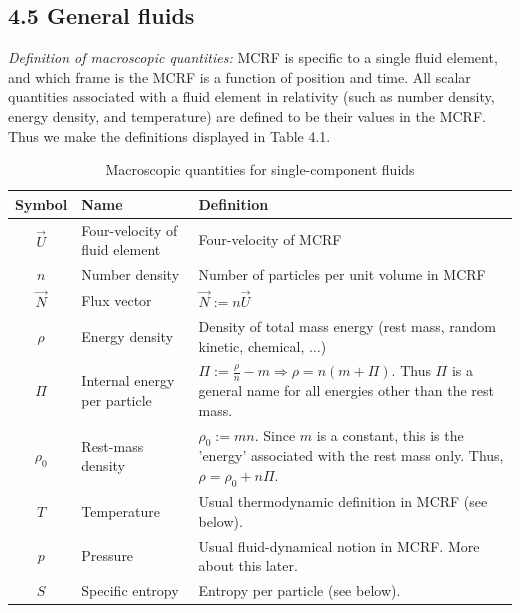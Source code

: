 \documentclass[12pt]{book}
\begin{document}
    \subsection{4.5 General fluids}

    \textit{Definition of macroscopic quantities:}
    MCRF is specific to a single fluid element, and which frame is the MCRF is a function of position and time. All scalar quantities associated with a fluid element in relativity (such as number density, energy density, and temperature) are defined to be their values in the MCRF. Thus we make the definitions displayed in Table 4.1.
    \begin{table}[h]
    \centering
    \begin{tabular}{|c|l|l|}
    \hline
    \textbf{Symbol} & \textbf{Name} & \textbf{Definition} \\ \hline
    \(\vec{U}\) & Four-velocity of fluid element & Four-velocity of MCRF \\ \hline
    \(n\) & Number density & Number of particles per unit volume in MCRF \\ \hline
    \(\vec{N}\) & Flux vector & \(\vec{N} := n\vec{U}\) \\ \hline
    \(\rho\) & Energy density & Density of total mass energy (rest mass, random kinetic, chemical, $\dots$)\\ \hline
    \(\Pi\) & Internal energy per particle & \(\Pi := \frac{\rho}{n} - m \Rightarrow \rho = n(m + \Pi)\). Thus \(\Pi\) is a general name for all energies other than the rest mass.\\ \hline
    \(\rho_0\) & Rest-mass density & \(\rho_0 := mn\). Since \(m\) is a constant, this is the 'energy' associated with the rest mass only. Thus, \(\rho = \rho_0 + n\Pi\).\\ \hline
    \(T\) & Temperature & Usual thermodynamic definition in MCRF (see below). \\ \hline
    \(p\) & Pressure & Usual fluid-dynamical notion in MCRF. More about this later. \\ \hline
    \(S\) & Specific entropy & Entropy per particle (see below). \\ \hline
    \end{tabular}
    \caption{Macroscopic quantities for single-component fluids}
    \label{table 4.1}
    \end{table}
    
\end{document}
